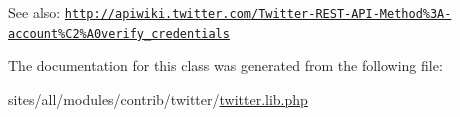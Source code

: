 \begin{Desc}
\item[See also:]\href{http://apiwiki.twitter.com/Twitter-REST-API-Method%3A-account%C2%A0verify_credentials}{\tt http://apiwiki.twitter.com/Twitter-REST-API-Method\%3A-account\%C2\%A0verify\_\-credentials} \end{Desc}


The documentation for this class was generated from the following file:\begin{CompactItemize}
\item 
sites/all/modules/contrib/twitter/\hyperlink{twitter_8lib_8php}{twitter.lib.php}\end{CompactItemize}

